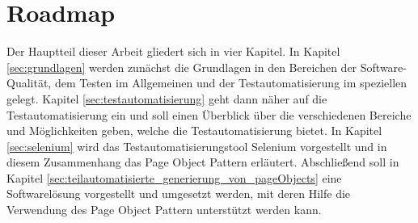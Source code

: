 \section{Roadmap}
\label{roadmap}
Der Hauptteil dieser Arbeit gliedert sich in vier Kapitel. In Kapitel \ref{sec:grundlagen} werden zunächst die Grundlagen in den Bereichen der Software-Qualität, dem Testen im Allgemeinen und der Testautomatisierung im speziellen gelegt.
Kapitel \ref{sec:testautomatisierung} geht dann näher auf die Testautomatisierung ein und soll einen Überblick über die verschiedenen Bereiche und Möglichkeiten geben, welche die Testautomatisierung bietet.
In Kapitel \ref{sec:selenium} wird das Testautomatisierungstool Selenium vorgestellt und in diesem Zusammenhang das Page Object Pattern erläutert.
Abschließend soll in Kapitel \ref{sec:teilautomatisierte_generierung_von_pageObjects} eine Softwarelösung vorgestellt und umgesetzt werden, mit deren Hilfe die Verwendung des Page Object Pattern unterstützt werden kann.

  




